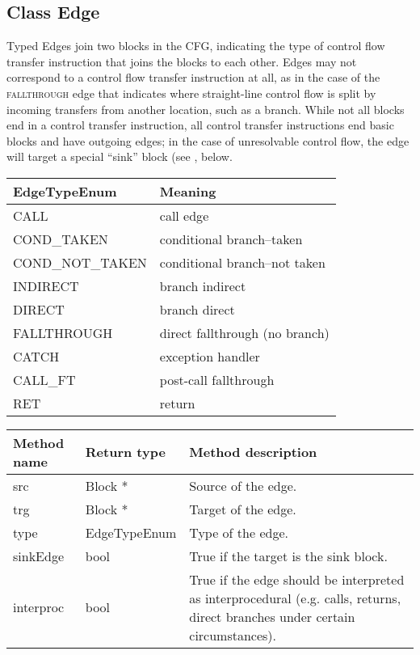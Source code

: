 \subsection{Class Edge}


Typed Edges join two blocks in the CFG, indicating the type of control flow
transfer instruction that joins the blocks to each other. Edges may not correspond
to a control flow transfer instruction at all, as in the case of the {\scshape
fallthrough} edge that indicates where straight-line control flow is split by
incoming transfers from another location, such as a branch. While not all
blocks end in a control transfer instruction, all control transfer instructions
end basic blocks and have outgoing edges; in the case of unresolvable control
flow, the edge will target a special ``sink'' block (see ,
below.

\begin{center}
\begin{tabular}{ll}
\toprule
EdgeTypeEnum & Meaning \\
\midrule
CALL & call edge \\
COND\_TAKEN & conditional branch--taken \\
COND\_NOT\_TAKEN & conditional branch--not taken \\
INDIRECT & branch indirect \\
DIRECT & branch direct \\
FALLTHROUGH & direct fallthrough (no branch) \\
CATCH & exception handler \\
CALL\_FT & post-call fallthrough \\
RET & return \\
\bottomrule
\end{tabular}
\end{center}

\begin{tabular}{p{1.25in}p{1.125in}p{3.125in}}
	Method name & Return type & Method description \\
	\hline
	src & Block * & Source of the edge. \\
	trg & Block * & Target of the edge. \\
	type & EdgeTypeEnum & Type of the edge. \\
	sinkEdge & bool & True if the target is the sink block. \\
	interproc & bool & True if the edge should be interpreted as interprocedural (e.g. calls, returns, direct branches under certain circumstances). \\
\end{tabular}
